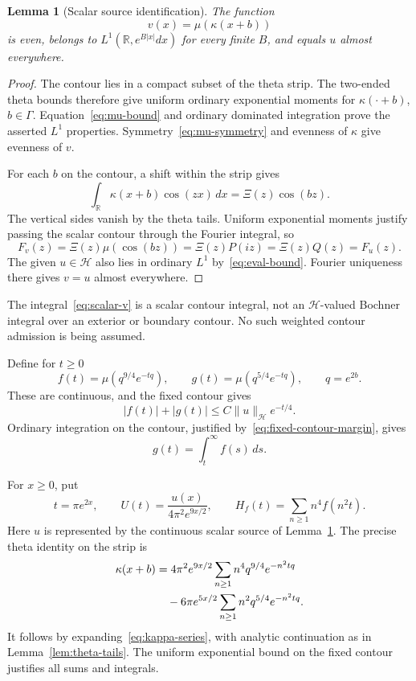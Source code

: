 \documentclass[11pt,a4paper]{article}
\numberwithin{equation}{section}
\newtheorem{lemma}[theorem]{Lemma}
\theoremstyle{definition}
\theoremstyle{remark}
\newcommand{\R}{\mathbb R}
\newcommand{\Hh}{\mathcal H}
\newcommand{\norm}[1]{\lVert #1\rVert}
\begin{document}
\begin{lemma}[Scalar source identification]\label{lem:scalar-source}
The function
\begin{equation}\label{eq:scalar-v}
 v(x)=\mu(\kappa(x+b))
\end{equation}
is even, belongs to $L^1(\R,e^{B|x|}dx)$ for every finite $B$, and equals $u$ almost everywhere.
\end{lemma}
\begin{proof}
The contour lies in a compact subset of the theta strip. The two-ended theta bounds therefore give uniform ordinary exponential moments for $\kappa(\cdot+b)$, $b\in\Gamma$. Equation~\eqref{eq:mu-bound} and ordinary dominated integration prove the asserted $L^1$ properties. Symmetry~\eqref{eq:mu-symmetry} and evenness of $\kappa$ give evenness of $v$.

For each $b$ on the contour, a shift within the strip gives
\[
 \int_\R\kappa(x+b)\cos(zx)\,dx=\Xi(z)\cos(bz).
\]
The vertical sides vanish by the theta tails. Uniform exponential moments justify passing the scalar contour through the Fourier integral, so
\[
 F_v(z)=\Xi(z)\mu(\cos(bz))=\Xi(z)P(iz)=\Xi(z)Q(z)=F_u(z).
\]
The given $u\in\Hh$ also lies in ordinary $L^1$ by~\eqref{eq:eval-bound}. Fourier uniqueness there gives $v=u$ almost everywhere.
\end{proof}

The integral~\eqref{eq:scalar-v} is a scalar contour integral, not an $\Hh$-valued Bochner integral over an exterior or boundary contour. No such weighted contour admission is being assumed.

Define for $t\ge0$
\begin{equation}\label{eq:fg-source}
 f(t)=\mu(q^{9/4}e^{-tq}),\qquad
 g(t)=\mu(q^{5/4}e^{-tq}),\qquad q=e^{2b}.
\end{equation}
These are continuous, and the fixed contour gives
\begin{equation}\label{eq:fg-crude}
 |f(t)|+|g(t)|\le C\norm{u}_{\Hh}e^{-t/4}.
\end{equation}
Ordinary integration on the contour, justified by~\eqref{eq:fixed-contour-margin}, gives
\begin{equation}\label{eq:g-tail}
 g(t)=\int_t^\infty f(s)\,ds.
\end{equation}

For $x\ge0$, put
\begin{equation}\label{eq:t-U-H}
 t=\pi e^{2x},\qquad
 U(t)=\frac{u(x)}{4\pi^2e^{9x/2}},\qquad
 H_f(t)=\sum_{n\ge1}n^4f(n^2t).
\end{equation}
Here $u$ is represented by the continuous scalar source of Lemma~\ref{lem:scalar-source}. The precise theta identity on the strip is
\begin{align}
 \kappa(x+b)
 &=4\pi^2e^{9x/2}\sum_{n\ge1}n^4q^{9/4}e^{-n^2tq}\notag\\
 &\quad-6\pi e^{5x/2}\sum_{n\ge1}n^2q^{5/4}e^{-n^2tq}.
 \label{eq:exact-theta-q}
\end{align}
It follows by expanding~\eqref{eq:kappa-series}, with analytic continuation as in Lemma~\ref{lem:theta-tails}. The uniform exponential bound on the fixed contour justifies all sums and integrals.
\end{document}
